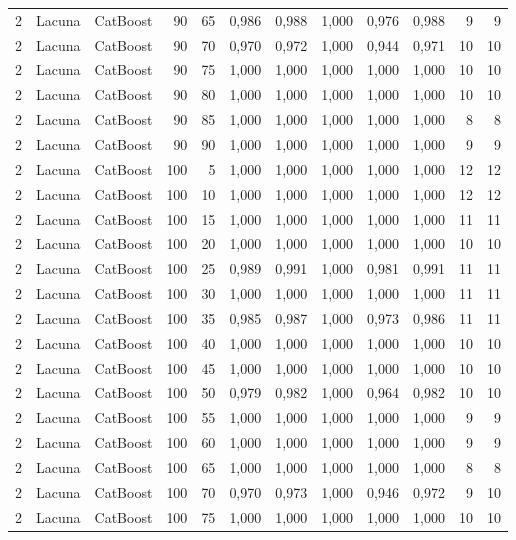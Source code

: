 \begin{longtable}{@{}rllrrrrrrrrr@{}}
2 & Lacuna & CatBoost & 90 & 65 & 0,986 & 0,988 & 1,000 & 0,976 & 0,988 & 9 & 9 \\
2 & Lacuna & CatBoost & 90 & 70 & 0,970 & 0,972 & 1,000 & 0,944 & 0,971 & 10 & 10 \\
2 & Lacuna & CatBoost & 90 & 75 & 1,000 & 1,000 & 1,000 & 1,000 & 1,000 & 10 & 10 \\
2 & Lacuna & CatBoost & 90 & 80 & 1,000 & 1,000 & 1,000 & 1,000 & 1,000 & 10 & 10 \\
2 & Lacuna & CatBoost & 90 & 85 & 1,000 & 1,000 & 1,000 & 1,000 & 1,000 & 8 & 8 \\
2 & Lacuna & CatBoost & 90 & 90 & 1,000 & 1,000 & 1,000 & 1,000 & 1,000 & 9 & 9 \\
2 & Lacuna & CatBoost & 100 & 5 & 1,000 & 1,000 & 1,000 & 1,000 & 1,000 & 12 & 12 \\
2 & Lacuna & CatBoost & 100 & 10 & 1,000 & 1,000 & 1,000 & 1,000 & 1,000 & 12 & 12 \\
2 & Lacuna & CatBoost & 100 & 15 & 1,000 & 1,000 & 1,000 & 1,000 & 1,000 & 11 & 11 \\
2 & Lacuna & CatBoost & 100 & 20 & 1,000 & 1,000 & 1,000 & 1,000 & 1,000 & 10 & 10 \\
2 & Lacuna & CatBoost & 100 & 25 & 0,989 & 0,991 & 1,000 & 0,981 & 0,991 & 11 & 11 \\
2 & Lacuna & CatBoost & 100 & 30 & 1,000 & 1,000 & 1,000 & 1,000 & 1,000 & 11 & 11 \\
2 & Lacuna & CatBoost & 100 & 35 & 0,985 & 0,987 & 1,000 & 0,973 & 0,986 & 11 & 11 \\
2 & Lacuna & CatBoost & 100 & 40 & 1,000 & 1,000 & 1,000 & 1,000 & 1,000 & 10 & 10 \\
2 & Lacuna & CatBoost & 100 & 45 & 1,000 & 1,000 & 1,000 & 1,000 & 1,000 & 10 & 10 \\
2 & Lacuna & CatBoost & 100 & 50 & 0,979 & 0,982 & 1,000 & 0,964 & 0,982 & 10 & 10 \\
2 & Lacuna & CatBoost & 100 & 55 & 1,000 & 1,000 & 1,000 & 1,000 & 1,000 & 9 & 9 \\
2 & Lacuna & CatBoost & 100 & 60 & 1,000 & 1,000 & 1,000 & 1,000 & 1,000 & 9 & 9 \\
2 & Lacuna & CatBoost & 100 & 65 & 1,000 & 1,000 & 1,000 & 1,000 & 1,000 & 8 & 8 \\
2 & Lacuna & CatBoost & 100 & 70 & 0,970 & 0,973 & 1,000 & 0,946 & 0,972 & 9 & 10 \\
2 & Lacuna & CatBoost & 100 & 75 & 1,000 & 1,000 & 1,000 & 1,000 & 1,000 & 10 & 10 \\

\end{longtable}
